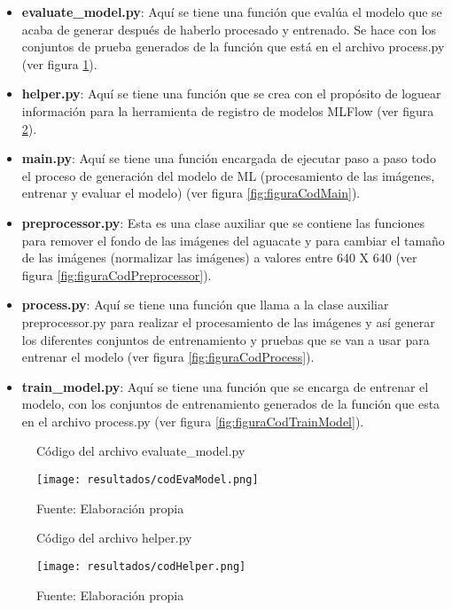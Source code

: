 \begin{itemize}
    \item \textbf{evaluate\_model.py}: Aquí se tiene una función que evalúa el modelo que se acaba de generar después de haberlo procesado y entrenado. Se hace con los conjuntos de prueba generados de la función que está en el archivo process.py (ver figura \ref{fig:figuraCodEvaModel}).
    \item \textbf{helper.py}: Aquí se tiene una función que se crea con el propósito de loguear información para la herramienta de registro de modelos MLFlow (ver figura \ref{fig:figuraCodHelper}).
    \item \textbf{main.py}: Aquí se tiene una función encargada de ejecutar paso a paso todo el proceso de generación del modelo de ML (procesamiento de las imágenes, entrenar y evaluar el modelo) (ver figura \ref{fig:figuraCodMain}).
    \item \textbf{preprocessor.py}: Esta es una clase auxiliar que se contiene las funciones para remover el fondo de las imágenes del aguacate y para cambiar el tamaño de las imágenes (normalizar las imágenes) a valores entre 640 X 640 (ver figura \ref{fig:figuraCodPreprocessor}).
    \item \textbf{process.py}: Aquí se tiene una función que llama a la clase auxiliar preprocessor.py para realizar el procesamiento de las imágenes y así generar los diferentes conjuntos de entrenamiento y pruebas que se van a usar para entrenar el modelo (ver figura \ref{fig:figuraCodProcess}).
    \item \textbf{train\_model.py}: Aquí se tiene una función que se encarga de entrenar el modelo, con los conjuntos de entrenamiento generados de la función que esta en el archivo process.py (ver figura \ref{fig:figuraCodTrainModel}).
\end{itemize}

\begin{figure}[h]
\centering
\caption{Código del archivo evaluate\_model.py}
\texttt{[image: resultados/codEvaModel.png]}
\caption*{\footnotesize Fuente: Elaboración propia}
\label{fig:figuraCodEvaModel}
\end{figure}

\newpage

\begin{figure}[h]
\centering
\caption{Código del archivo helper.py}
\texttt{[image: resultados/codHelper.png]}
\caption*{\footnotesize Fuente: Elaboración propia}
\label{fig:figuraCodHelper}
\end{figure}

